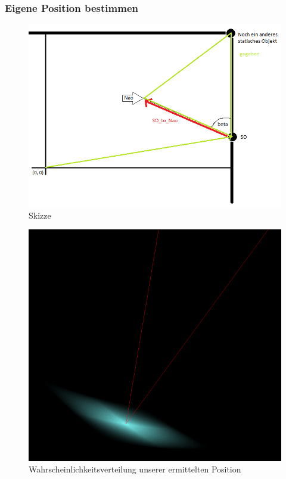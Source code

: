 \subsubsection*{Eigene Position bestimmen}
\begin{figure}[h]
\begin{center}
\includegraphics[scale=0.6]{Positionsbestimmung}
\end{center}
\caption{Skizze}
\end{figure}
\begin{figure}[h]
\begin{center}
\includegraphics[scale=0.3]{654px-Pos_wahrscheinlichkeit}
\end{center}
\caption{Wahrscheinlichkeitsverteilung unserer ermittelten Position}
\end{figure}

